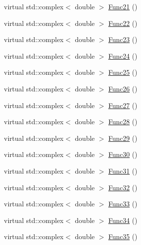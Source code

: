 \begin{DoxyCompactItemize}
\item 
virtual std\-::complex$<$ double $>$ \hyperlink{classosea_1_1ofreq_1_1_equationof_motion_a771493c65f06e5085e3b0c9150aa0427}{Func21} ()
\item 
virtual std\-::complex$<$ double $>$ \hyperlink{classosea_1_1ofreq_1_1_equationof_motion_aa9924875622062551456bab5ea3ecb20}{Func22} ()
\item 
virtual std\-::complex$<$ double $>$ \hyperlink{classosea_1_1ofreq_1_1_equationof_motion_ac5cf42463f4da9f251436e80da15499a}{Func23} ()
\item 
virtual std\-::complex$<$ double $>$ \hyperlink{classosea_1_1ofreq_1_1_equationof_motion_abe255c1e5217273f9adfc3c4c5f83727}{Func24} ()
\item 
virtual std\-::complex$<$ double $>$ \hyperlink{classosea_1_1ofreq_1_1_equationof_motion_a22e70f9d370ce2bd8d10621d6b686da8}{Func25} ()
\item 
virtual std\-::complex$<$ double $>$ \hyperlink{classosea_1_1ofreq_1_1_equationof_motion_aef40214a54959ffffd9b4c45e3fa0648}{Func26} ()
\item 
virtual std\-::complex$<$ double $>$ \hyperlink{classosea_1_1ofreq_1_1_equationof_motion_af534561eec5a3d27212076a60043a23c}{Func27} ()
\item 
virtual std\-::complex$<$ double $>$ \hyperlink{classosea_1_1ofreq_1_1_equationof_motion_a6d12f67c42964bef80db4268b8033c6d}{Func28} ()
\item 
virtual std\-::complex$<$ double $>$ \hyperlink{classosea_1_1ofreq_1_1_equationof_motion_a9e62ab3a3096c28a578367332d5846da}{Func29} ()
\item 
virtual std\-::complex$<$ double $>$ \hyperlink{classosea_1_1ofreq_1_1_equationof_motion_a172d2920a71a1b24f467994f6fea8f99}{Func30} ()
\item 
virtual std\-::complex$<$ double $>$ \hyperlink{classosea_1_1ofreq_1_1_equationof_motion_a5b020264aabe3cdaf95c04e9e7ca1874}{Func31} ()
\item 
virtual std\-::complex$<$ double $>$ \hyperlink{classosea_1_1ofreq_1_1_equationof_motion_a240b245630cd6751721233de8560200a}{Func32} ()
\item 
virtual std\-::complex$<$ double $>$ \hyperlink{classosea_1_1ofreq_1_1_equationof_motion_a9f12298af512bf091c3b8a57c1e5f96c}{Func33} ()
\item 
virtual std\-::complex$<$ double $>$ \hyperlink{classosea_1_1ofreq_1_1_equationof_motion_aa162c47e961c0e3064bd0d57e5c60764}{Func34} ()
\item 
virtual std\-::complex$<$ double $>$ \hyperlink{classosea_1_1ofreq_1_1_equationof_motion_ac658169efe42c44bb5e14c5f9131478c}{Func35} ()

\end{DoxyCompactItemize}
